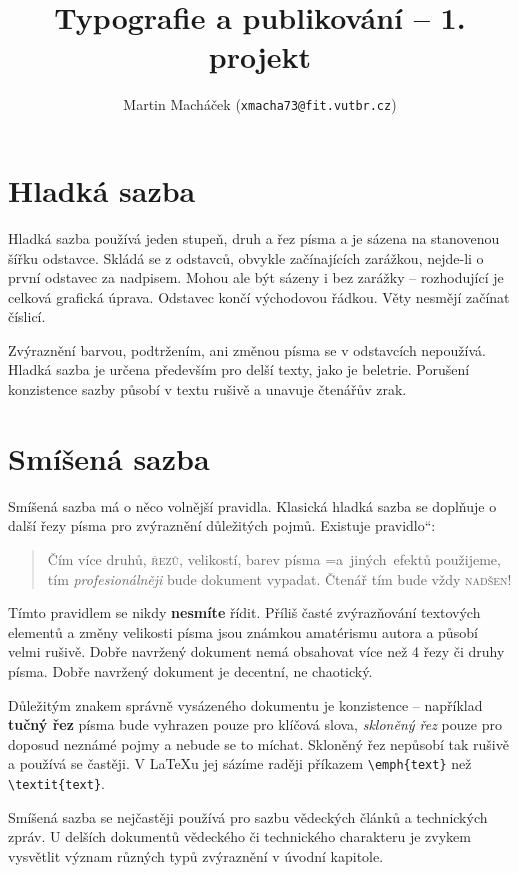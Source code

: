 \documentclass[a4paper, 10pt, twocolumn]{article}
\title{Typografie a publikování -- 1. projekt}
\author{Martin Macháček (\texttt{xmacha73@fit.vutbr.cz})}
\date{}
\newcommand\dunderline[3][-1pt]{{%
  \setbox0=\hbox{#3}
  \ooalign{\copy0\cr\rule[\dimexpr#1-#2\relax]{\wd0}{#2}}}}
\begin{document}
\maketitle
\section{Hladká sazba}
    Hladká sazba používá jeden stupeň, druh a řez písma a je sázena na stanovenou šířku odstavce. Skládá se z odstavců, obvykle začínajících zarážkou, nejde-li o první odstavec za nadpisem. Mohou ale být sázeny i bez zarážky -- rozhodující je celková grafická úprava. Odstavec končí východovou řádkou. Věty nesmějí začínat číslicí. 

    Zvýraznění barvou, podtržením, ani změnou písma se v odstavcích nepoužívá. Hladká sazba je určena především pro delší texty, jako je beletrie. Porušení konzistence sazby působí v textu rušivě a unavuje čtenářův zrak.


\section{Smíšená sazba}
    Smíšená sazba má o něco volnější pravidla. Klasická hladká sazba se doplňuje o další řezy písma pro zvýraznění důležitých pojmů. Existuje \quotedblbase pravidlo\textquotedblleft :
    
\begin{quotation}
    {\selectfont Čím více druhů,} \textsc{řezů}, {\tiny velikostí}, 
    barev písma \dunderline[-2pt]{1pt}{a jiných efektů}  použijeme, tím {\large\emph{profesionálněji}} bude dokument vypadat. Čtenář tím bude vždy \textsc{nadšen}!
\end{quotation}

    Tímto pravidlem se nikdy \textbf{nesmíte} řídit. Příliš časté {\large zvýrazňování} textových elementů a změny velikosti {\huge písma} jsou známkou amatérismu autora a působí {\Huge velmi} rušivě. Dobře navržený dokument nemá obsahovat více než
    4 řezy či druhy písma. Dobře navržený dokument je decentní, ne chaotický.

    Důležitým znakem správně vysázeného dokumentu je konzistence -- například \textbf{tučný řez} písma bude vyhrazen pouze pro klíčová slova, \emph{skloněný řez} pouze pro doposud neznámé pojmy a nebude se to míchat. Skloněný řez nepůsobí tak rušivě a používá se častěji. V \LaTeX u jej sázíme raději příkazem \verb|\emph{text}| než \verb|\textit{text}|.

    Smíšená sazba se nejčastěji používá pro sazbu vědeckých článků a technických zpráv. U delších dokumentů vědeckého či technického charakteru je zvykem vysvětlit význam různých typů zvýraznění v úvodní kapitole.
\end{document}

